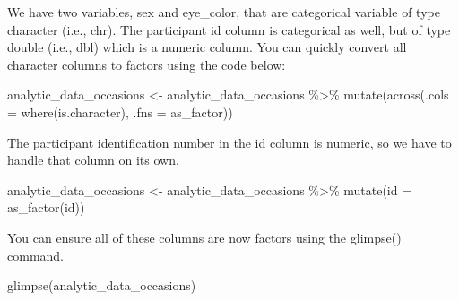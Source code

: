 \documentclass[
]{krantz}
\makeatletter
\newenvironment{Shaded}{\begin{snugshade}}{\end{snugshade}}
\newcommand{\AttributeTok}[1]{\textcolor[rgb]{0.61,0.61,0.61}{#1}}
\newcommand{\FunctionTok}[1]{\textcolor[rgb]{0,0,0}{#1}}
\newcommand{\NormalTok}[1]{#1}
\newcommand{\OtherTok}[1]{\textcolor[rgb]{0.37,0.37,0.37}{#1}}
\newcommand{\SpecialCharTok}[1]{\textcolor[rgb]{0,0,0}{#1}}
\newenvironment{kframe}{%
\medskip{}
\setlength{\fboxsep}{.8em}
 \def\at@end@of@kframe{}%
 \ifinner\ifhmode%
  \def\at@end@of@kframe{\end{minipage}}%
  \begin{minipage}{\columnwidth}%
 \fi\fi%
 \def\FrameCommand##1{\hskip\@totalleftmargin \hskip-\fboxsep
 \colorbox{shadecolor}{##1}\hskip-\fboxsep
     \hskip-\linewidth \hskip-\@totalleftmargin \hskip\columnwidth}%
 \MakeFramed {\advance\hsize-\width
   \@totalleftmargin\z@ \linewidth\hsize
   \@setminipage}}%
 {\par\unskip\endMakeFramed%
 \at@end@of@kframe}
\renewenvironment{Shaded}{\begin{kframe}}{\end{kframe}}
\makeatother
\begin{document}
We have two variables, sex and eye\_color, that are categorical variable of type character (i.e., chr). The participant id column is categorical as well, but of type double (i.e., dbl) which is a numeric column. You can quickly convert all character columns to factors using the code below:

\begin{Shaded}
\begin{Highlighting}[]
\NormalTok{analytic\_data\_occasions }\OtherTok{\textless{}{-}}\NormalTok{ analytic\_data\_occasions }\SpecialCharTok{\%\textgreater{}\%}
  \FunctionTok{mutate}\NormalTok{(}\FunctionTok{across}\NormalTok{(}\AttributeTok{.cols =} \FunctionTok{where}\NormalTok{(is.character),}
                \AttributeTok{.fns =}\NormalTok{ as\_factor))}
\end{Highlighting}
\end{Shaded}

The participant identification number in the id column is numeric, so we have to handle that column on its own.

\begin{Shaded}
\begin{Highlighting}[]
\NormalTok{analytic\_data\_occasions }\OtherTok{\textless{}{-}}\NormalTok{ analytic\_data\_occasions }\SpecialCharTok{\%\textgreater{}\%}
  \FunctionTok{mutate}\NormalTok{(}\AttributeTok{id =} \FunctionTok{as\_factor}\NormalTok{(id))}
\end{Highlighting}
\end{Shaded}

You can ensure all of these columns are now factors using the glimpse() command.

\begin{Shaded}
\begin{Highlighting}[]
\FunctionTok{glimpse}\NormalTok{(analytic\_data\_occasions)}
\end{Highlighting}
\end{Shaded}
\end{document}
